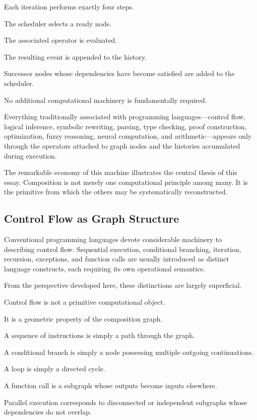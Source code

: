\documentclass[12pt,oneside]{article}
\begin{document}
Each iteration performs exactly four steps.

The scheduler selects a ready node.

The associated operator is evaluated.

The resulting event is appended to the history.

Successor nodes whose dependencies have become satisfied are added to the scheduler.

No additional computational machinery is fundamentally required.

Everything traditionally associated with programming languages—control flow, logical inference, symbolic rewriting, parsing, type checking, proof construction, optimization, fuzzy reasoning, neural computation, and arithmetic—appears only through the operators attached to graph nodes and the histories accumulated during execution.

The remarkable economy of this machine illustrates the central thesis of this essay. Composition is not merely one computational principle among many. It is the primitive from which the others may be systematically reconstructed.

\subsection{Control Flow as Graph Structure}

Conventional programming languages devote considerable machinery to describing control flow. Sequential execution, conditional branching, iteration, recursion, exceptions, and function calls are usually introduced as distinct language constructs, each requiring its own operational semantics.

From the perspective developed here, these distinctions are largely superficial.

Control flow is not a primitive computational object.

It is a geometric property of the composition graph.

A sequence of instructions is simply a path through the graph.

A conditional branch is simply a node possessing multiple outgoing continuations.

A loop is simply a directed cycle.

A function call is a subgraph whose outputs become inputs elsewhere.

Parallel execution corresponds to disconnected or independent subgraphs whose dependencies do not overlap.
\end{document}
